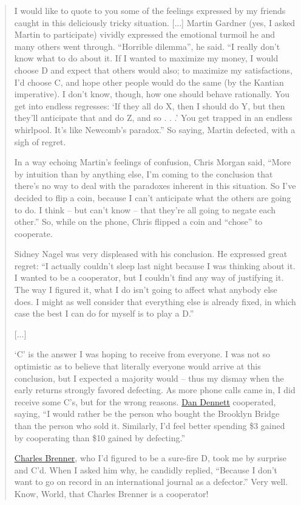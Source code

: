 \begin{quote}
I would like to quote to you some of the feelings expressed by my
friends caught in this deliciously tricky situation. {[}...{]} Martin
Gardner (yes, I asked Martin to participate) vividly expressed the
emotional turmoil he and many others went through. ``Horrible dilemma'',
he said. ``I really don't know what to do about it. If I wanted to
maximize my money, I would choose D and expect that others would also;
to maximize my satisfactions, I'd choose C, and hope other people would
do the same (by the Kantian imperative). I don't know, though, how one
should behave rationally. You get into endless regresses: `If they all
do X, then I should do Y, but then they'll anticipate that and do Z, and
so . . .' You get trapped in an endless whirlpool. It's like Newcomb's
paradox.'' So saying, Martin defected, with a sigh of regret.

In a way echoing Martin's feelings of confusion, Chris Morgan said,
``More by intuition than by anything else, I'm coming to the conclusion
that there's no way to deal with the paradoxes inherent in this
situation. So I've decided to flip a coin, because I can't anticipate
what the others are going to do. I think -- but can't know -- that they're
all going to negate each other.'' So, while on the phone, Chris flipped
a coin and ``chose'' to cooperate.

Sidney Nagel was very displeased with his conclusion. He expressed great
regret: ``I actually couldn't sleep last night because I was thinking
about it. I wanted to be a cooperator, but I couldn't find any way of
justifying it. The way I figured it, what I do isn't going to affect
what anybody else does. I might as well consider that everything else is
already fixed, in which case the best I can do for myself is to play a
D.''

{[}...{]}

`C' is the answer I was hoping to receive from everyone. I was not so
optimistic as to believe that literally everyone would arrive at this
conclusion, but I expected a majority would -- thus my dismay when the
early returns strongly favored defecting. As more phone calls came in, I
did receive some C's, but for the wrong reasons.
\href{http://en.wikipedia.org/wiki/Dan\%20Dennett}{Dan Dennett}
cooperated, saying, ``I would rather be the person who bought the
Brooklyn Bridge than the person who sold it. Similarly, I'd feel better
spending \$3 gained by cooperating than \$10 gained by defecting.''

\href{http://en.wikipedia.org/wiki/Charles\%20Brenner}{Charles
Brenner}, who I'd figured to be a sure-fire D, took me by surprise and
C'd. When I asked him why, he candidly replied, ``Because I don't want
to go on record in an international journal as a defector.'' Very well.
Know, World, that Charles Brenner is a cooperator!


\end{quote}
